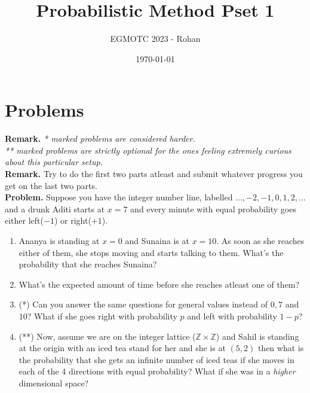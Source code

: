 \documentclass[12pt]{article}
\title{Probabilistic Method Pset 1}
\author{EGMOTC 2023 - Rohan}
\date{\today}
\begin{document}
\maketitle

\newcommand{\localtextbulletone}{\textcolor{black}{\raisebox{.45ex}{\rule{.6ex}{.6ex}}}}
\renewcommand{\labelitemi}{\localtextbulletone}

\section*{Problems}
\vspace{1cm}
\thispagestyle{empty}

\textbf{Remark.} \textit{* marked problems are considered harder.\\ ** marked problems are strictly optional for the ones feeling extremely curious about this particular setup.\\}
\textbf{Remark.} Try to do the first two parts atleast and submit whatever progress you get on the last two parts.\\

\textbf{Problem.} Suppose you have the integer number line, labelled $\ldots,-2,-1,0,1,2,\ldots$ and a drunk Aditi starts at $x=7$ and every minute with equal probability goes either left($-1$) or right($+1$).
    \begin{enumerate}
        \item Ananya is standing at $x=0$ and Sunaina is at $x=10$. As soon as she reaches either of them, she stops moving and starts talking to them. What's the probability that she reaches Sunaina?
        \item What's the expected amount of time before she reaches atleast one of them?
        \item (*) Can you answer the same questions for general values instead of $0,7$ and $10$? What if she goes right with probability $p$ and left with probability $1-p$?
        \item (**) Now, assume we are on the integer lattice ($\mathbb{Z}\times \mathbb{Z}$) and Sahil is standing at the origin with an iced tea stand for her and she is at $(5,2)$ then what is the probability that she gets an infinite number of iced teas if she moves in each of the 4 directions with equal probability? What if she was in a \textit{higher} dimensional space?  
    \end{enumerate}
\end{document}
